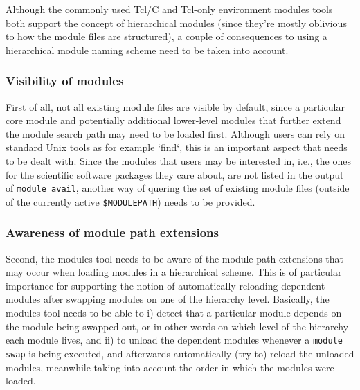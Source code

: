 Although the commonly used Tcl/C and Tcl-only environment modules tools
both support the concept of hierarchical modules (since they're mostly
oblivious to how the module files are structured), a couple of consequences
to using a hierarchical module naming scheme need to be taken into account.

\label{sec:hierarchical_consequences_visibility}
\subsubsection{Visibility of modules}
First of all, not all existing module files are visible by default, since
a particular core module and potentially additional lower-level modules
that further extend the module search path may need to be loaded first.
Although users can rely on standard Unix tools as for example `find`, this
is an important aspect that needs to be dealt with. Since the modules that
users may be interested in, i.e., the ones for the scientific software
packages they care about, are not listed in the output of \texttt{module
avail}, another way of quering the set of existing module files (outside
of the currently active \texttt{\$MODULEPATH}) needs to be
provided.

\label{sec:hierarchical_consequences_extensions}
\subsubsection{Awareness of module path extensions}
Second, the modules tool needs to be aware of the module path extensions that
may occur when loading modules in a hierarchical scheme. This is of
particular importance for supporting the notion of automatically reloading
dependent modules after swapping modules on one of the hierarchy level.
Basically, the modules tool needs to be able to i) detect that a particular
module depends on the module being swapped out, or in other words on which
level of the hierarchy each module lives, and ii) to unload the dependent
modules whenever a \texttt{module swap} is being executed, and afterwards
automatically (try to) reload the unloaded modules, meanwhile taking into
account the order in which the modules were loaded.

\label{sec:hierarchical_consequences_availability}
